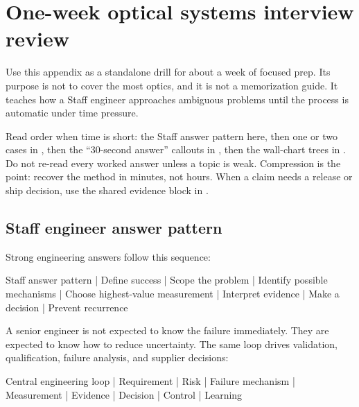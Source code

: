 \chapter{One-week optical systems interview review}
\label{app:interview-review}

Use this appendix as a standalone drill for about a week of focused prep. Its
purpose is not to cover the most optics, and it is not a memorization guide.
It teaches how a Staff engineer approaches ambiguous problems until the process
is automatic under time pressure.

Read order when time is short: the Staff answer pattern here, then one or two
cases in , then the ``30-second answer'' callouts in
, then the wall-chart trees in
. Do not re-read every worked answer unless a topic is
weak. Compression is the point: recover the method in minutes, not hours. When a claim needs a release or ship decision, use the shared evidence block in .



\section{Staff engineer answer pattern}
\label{sec:interview-staff-pattern}

Strong engineering answers follow this sequence:

\begin{dectree}
Staff answer pattern
  |
Define success
  |
Scope the problem
  |
Identify possible mechanisms
  |
Choose highest-value measurement
  |
Interpret evidence
  |
Make a decision
  |
Prevent recurrence
\end{dectree}

A senior engineer is not expected to know the failure immediately. They are
expected to know how to reduce uncertainty. The same loop drives validation,
qualification, failure analysis, and supplier decisions:

\begin{dectree}
Central engineering loop
  |
Requirement
  |
Risk
  |
Failure mechanism
  |
Measurement
  |
Evidence
  |
Decision
  |
Control
  |
Learning
\end{dectree}

